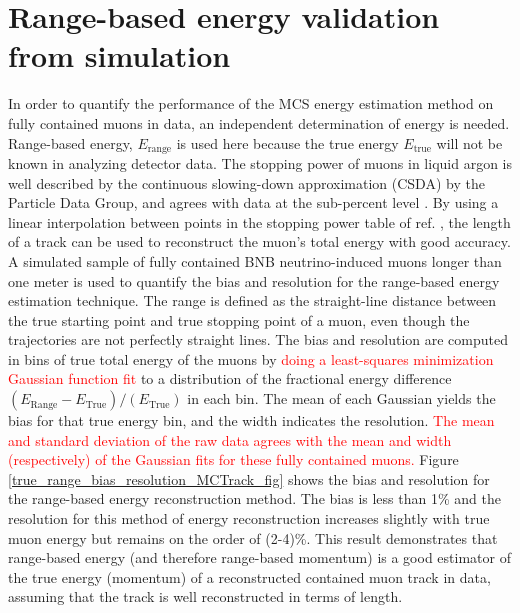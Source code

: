 \documentclass[a4paper,11pt]{article}
\begin{document}
\section{Range-based energy validation from simulation}\label{Range_Energy_Validation_section}
In order to quantify the performance of the MCS energy estimation method on fully contained muons in data, an independent determination of energy is needed. Range-based energy, $E_{\text{range}}$ is used here because the true energy $E_{\text{true}}$ will not be known in analyzing detector data. The stopping power of muons in liquid argon is well described by the continuous slowing-down approximation (CSDA) by the Particle Data Group, and agrees with data at the sub-percent level \cite{MIPenergysource,PDG_spline_table,NISTdata}. By using a linear interpolation between points in the stopping power table of ref. \cite{PDG_spline_table}, the length of a track can be used to reconstruct the muon's total energy with good accuracy. A simulated sample of fully contained BNB neutrino-induced muons longer than one meter is used to quantify the bias and resolution for the range-based energy estimation technique. The range is defined as the straight-line distance between the true starting point and true stopping point of a muon, even though the trajectories are not perfectly straight lines. The bias and resolution are computed in bins of true total energy of the muons by \textcolor{red}{doing a least-squares minimization Gaussian function fit} to a distribution of the fractional energy difference $(E_{\text{Range}}-E_{\text{True}})/(E_{\text{True}})$ in each bin. The mean of each Gaussian yields the bias for that true energy bin, and the width indicates the resolution. \textcolor{red}{The mean and standard deviation of the raw data agrees with the mean and width (respectively) of the Gaussian fits for these fully contained muons.} Figure \ref{true_range_bias_resolution_MCTrack_fig} shows the bias and resolution for the range-based energy reconstruction method. The bias is less than 1\% and the resolution for this method of energy reconstruction increases slightly with true muon energy but remains on the order of (2-4)\%. This result demonstrates that range-based energy (and therefore range-based momentum) is a good estimator of the true energy (momentum) of a reconstructed contained muon track in data, assuming that the track is well reconstructed in terms of length.
\end{document}
